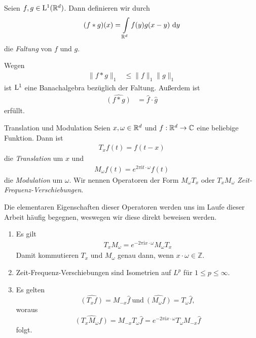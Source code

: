 \newpage
\begin{df}
	Seien $ f, g \in \mathrm{L}^1(\mathbb{R}^d) $. Dann definieren wir durch
	\begin{equation}\label{eq:convolution}
	(f \ast g)(x) = \int \limits_{\mathbb{R}^d}
	f(y) g(x-y) \text{ d} y
	\end{equation}
	die \textit{Faltung} von $ f $ und $ g $.
\end{df}
Wegen
\begin{align}\label{eq:convolution_prop_1}
\| f \ast g \|_1 &\leq \| f\|_1 \|g \|_1
\end{align}
ist  $ \mathrm{L}^1 $ eine Banachalgebra bezüglich der Faltung. Außerdem ist
\begin{align}\label{eq:convolution_prop_2}
\widehat{(f \ast  g)} &= \hat{f} \cdot \hat{g}
\end{align}
erfüllt.

\begin{genericdf}{Translation und Modulation}
	Seien $ x, \omega \in \mathbb{R}^d $ und $ f : \mathbb{R}^d \to \mathbb{C}$ eine beliebige Funktion.
	Dann ist
	\begin{align}\label{eq:translation}
	T_x f(t)=  f(t-x) 
	\end{align}
	die \textit{Translation} um $ x $ und
	\begin{align}\label{eq:modulation}
	M_\omega f(t) = e^{2 \pi \mathrm{i} t \cdot \omega} f(t)
	\end{align}
	die \textit{Modulation} um $ \omega $. 
	Wir nennen Operatoren der Form $M_\omega T_x$ oder $T_x M_\omega$ \textit{Zeit-Frequenz-Verschiebungen}. 
 \end{genericdf}

Die elementaren Eigenschaften dieser Operatoren werden uns im Laufe dieser Arbeit häufig begegnen, weswegen wir diese direkt beweisen werden.

\begin{lem}\label{th:properties_TF}
	\begin{enumerate}[label =\textbf{(\roman*)}]
		\item Es gilt
		\begin{align}\label{eq:trans_mod_commutation_relation_1}
		T_x M_\omega = e^{-2 \pi \mathrm{i} x \cdot \omega} M_\omega T_x
		\end{align}
		Damit kommutieren $T_x$ und $M_\omega$ genau dann, wenn $x \cdot \omega \in \mathbb{Z}$.
		\item
		Zeit-Frequenz-Verschiebungen sind Isometrien auf $L^p$ für $1 \leq p \leq \infty$.
		\item
		Es gelten
		\begin{equation}\label{eq:trans_mod_fourier_1}
		\widehat{(T_x f)}= M_{-x} \hat{f} \ \text{und} \ \widehat{(M_\omega f)} = T_\omega \hat{f},
		\end{equation}
		woraus
		\begin{equation}\label{eq:trans_mod_fourier_2}
		\widehat{(T_x M_\omega f)} = M_{-x}T_\omega \hat{f} = e^{-2\pi \mathrm{i} x \cdot \omega} T_\omega M_{-x} \hat{f}
		\end{equation}
		folgt.
	\end{enumerate}
\end{lem}

